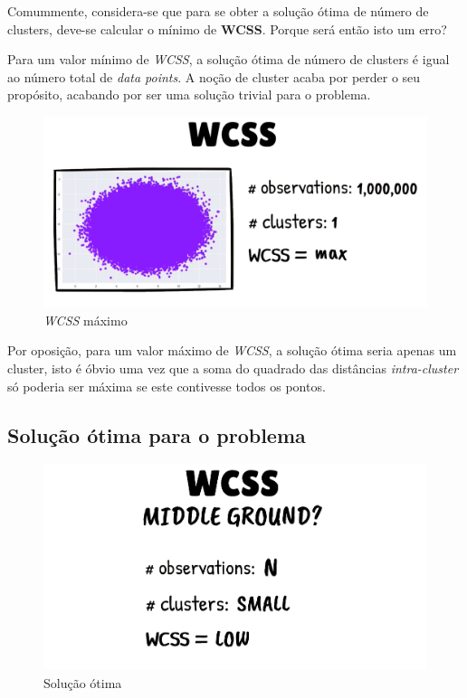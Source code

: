 \documentclass[12pt, a4paper, oneside]{scrreport}
\begin{document}
\par Comummente, considera-se que para se obter a solução ótima de número de clusters, deve-se calcular o mínimo de \textbf{WCSS}. 
Porque será então isto um erro?

\par Para um valor mínimo de \textit{WCSS}, a solução ótima de número de clusters é igual ao número total de \textit{data points}. A noção de cluster acaba por perder o seu propósito, acabando por ser uma solução trivial para o problema.


\begin{figure}
  \centering
  \includegraphics[scale=0.25]{wcss_maximize}
  \caption{\textit{WCSS} máximo}
\end{figure}

\par Por oposição, para um valor máximo de \textit{WCSS}, a solução ótima seria apenas um cluster, isto é óbvio uma vez que a soma do quadrado das distâncias \textit{intra-cluster} só poderia ser máxima se este contivesse todos os pontos.

\subsection{Solução ótima para o problema}

\begin{figure}
  \centering
  \includegraphics[scale=0.25]{wcss_otimo}
  \caption{Solução ótima}
  \end{figure}
  
\end{document}
